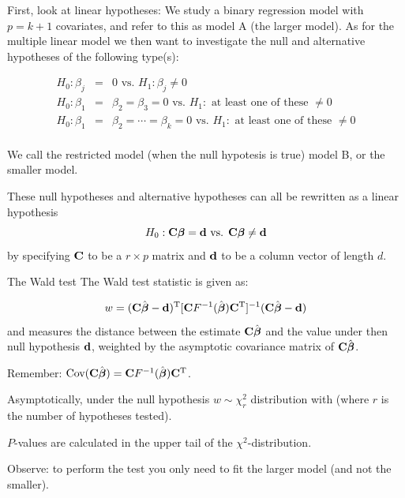 \documentclass[
  ignorenonframetext,
]{beamer}
\begin{document}
\begin{frame}
First, look at linear hypotheses: We study a binary regression model
with \(p=k+1\) covariates, and refer to this as model A (the larger
model). As for the multiple linear model we then want to investigate the
null and alternative hypotheses of the following type(s):

\begin{eqnarray*}
 H_0: \beta_{j}&=&0 \text{ vs. } H_1:\beta_j\neq 0\\
 H_0: \beta_{1}&=&\beta_{2}=\beta_{3}=0 \text{ vs. } H_1:\text{ at least one of these }\neq 0\\
 H_0: \beta_{1}&=&\beta_{2}=\cdots=\beta_{k}=0 \text{ vs. } H_1:\text{ at least one of these }\neq 0\\
 \end{eqnarray*}
\end{frame}

\begin{frame}
We call the restricted model (when the null hypotesis is true) model B,
or the smaller model.

These null hypotheses and alternative hypotheses can all be rewritten as
a linear hypothesis
\[H_0: {\bf C}{\bf \boldsymbol{\beta}}={\bf d} \text{ vs. } {\bf C}{\bf \boldsymbol{\beta}}\neq {\bf d} \]
by specifying \({\bf C}\) to be a \(r \times p\) matrix and \({\bf d}\)
to be a column vector of length \(d\).
\end{frame}

\begin{frame}
\begin{block}{The Wald test}
\label{the-wald-test}
The Wald test statistic is given as:

\[
w=({\bf C}\hat{{\bf \boldsymbol{\beta}}}-{\bf d})^{\text T}[{\bf C}F^{-1}(\hat{\boldsymbol{\beta}}){\bf C}^{\text T}]^{-1}({\bf C}\hat{{\bf \boldsymbol{\beta}}}-{\bf d})
\] and measures the distance between the estimate
\({\bf C}\hat{\boldsymbol{\beta}}\) and the value under then null
hypothesis \({\bf d}\), weighted by the asymptotic covariance matrix of
\({\bf C}\hat{\boldsymbol{\beta}}\).

Remember:
\(\text{Cov}({\bf C}\hat{\boldsymbol{\beta}})={\bf C}F^{-1}(\hat{\boldsymbol{\beta}}){\bf C}^{\text T}\).

Asymptotically, under the null hypothesis \(w \sim \chi_r^2\)
distribution with (where \(r\) is the number of hypotheses tested).

\(P\)-values are calculated in the upper tail of the
\(\chi^2\)-distribution.

Observe: to perform the test you only need to fit the larger model (and
not the smaller).
\end{block}
\end{frame}
\end{document}
